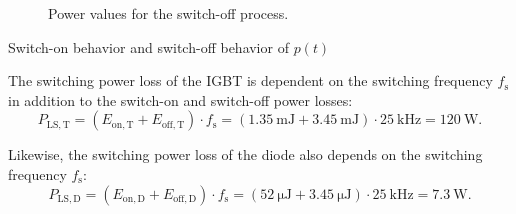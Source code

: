 \begin{solutionblock}
\begin{solutionfigure}[ht]
\begin{subfigure}[t]{0.45\textwidth}
        \caption{Power values for the switch-off process.}
        \label{fig:Power values for the switch-off process}
    \end{subfigure}
    \caption{Switch-on behavior and switch-off behavior of $p(t)$}
\end{solutionfigure}
\end{solutionblock}


\begin{solutionblock}
The switching power loss of the IGBT is dependent on the switching frequency $f_{\mathrm{s}}$ in addition to the switch-on and switch-off power losses:
\begin{equation}
    P_{\mathrm{LS,T}} =  (E_{\mathrm{on,T}} +  E_{\mathrm{off,T}}) \cdot f_{\mathrm{s}} = (\SI {1.35}{\milli\joule} + \SI {3.45}{\milli\joule}) \cdot \SI {25}{\kilo\hertz} = \SI {120}{\watt}.
 \end{equation}

 Likewise, the switching power loss of the diode also depends on the switching frequency $f_{\mathrm{s}}$:
 \begin{equation}
    P_{\mathrm{LS,D}} =  (E_{\mathrm{on,D}} +  E_{\mathrm{off,D}}) \cdot f_{\mathrm{s}} = (\SI {52}{\micro\joule} + \SI {3.45}{\micro\joule}) \cdot \SI {25}{\kilo\hertz} = \SI {7.3}{\watt}.
 \end{equation}
\end{solutionblock}

